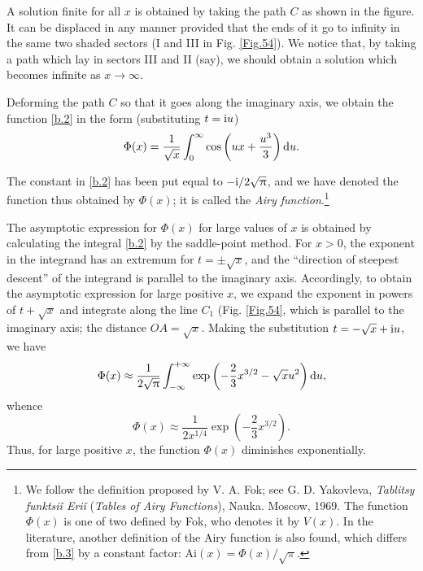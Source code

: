 A solution finite for all $ x $ is obtained by taking the path $ C $ as shown in the figure. It can be displaced in any manner provided that the ends of it go to infinity in the same two shaded sectors (I and III in Fig. \ref{Fig.54}). We notice that, by taking a path which lay in sectors III and II (say), we should obtain a solution which becomes infinite as $ x \to\infty $.

Deforming the path $ C $ so that it goes along the imaginary axis, we obtain the function \eqref{b.2} in the form (substituting $ t = \mathrm{i} u $)
\begin{equation}\label{b.3}
\Phi(x)=\frac{1}{\sqrt{x}}\int_{0}^{\infty}\cos\left(ux+\frac{u^3}{3} \right)\mathrm{d} u.
\end{equation}



The constant in \eqref{b.2} has been put equal to $ -\mathrm{i}/2\sqrt{\uppi} $, and we have denoted the function thus obtained by $ \Phi(x) $; it is called the \textit{Airy function}.\footnote{We follow the definition proposed by V. A. Fok; see G. D. Yakovleva, \textit{Tablitsy funktsi\v{i} Eri\v{i}} (\textit{Tables of Airy Functions}), Nauka. Moscow, 1969. The function $ \Phi(x) $ is one of two defined by Fok, who denotes it by $ V (x) $. In the literature, another definition of the Airy function is also found, which differs from \eqref{b.3} by a constant factor: $ \mathrm{Ai}(x) = \Phi(x)/\sqrt{\pi} $.}

The asymptotic expression for $ \Phi(x) $ for large values of $ x $ is obtained by calculating the integral \eqref{b.2} by the saddle-point method. For $ x > 0 $, the exponent in the integrand has an extremum for $ t = \pm\sqrt{x}  $, and the “direction of steepest descent” of the integrand is parallel to the imaginary axis. Accordingly, to obtain the asymptotic expression for large positive $ x $, we expand the exponent in powers of $ t + \sqrt{x} $ and integrate along the line $ C_1 $ (Fig. \ref{Fig.54}, which is parallel to the imaginary axis; the distance $ OA = \sqrt{x} $. Making the substitution $ t = -\sqrt{x} + \mathrm{i} u $, we have
\[ \Phi(x)\approx\frac{1}{2\sqrt{\uppi}}\int_{-\infty}^{+\infty}\exp\left(-\frac{2}{3}x^{3/2}-\sqrt{x}u^2 \right)\mathrm{d} u, \]
whence
\begin{equation}\label{b.4}
\Phi(x)\approx\frac{1}{2x^{1/4}}\exp\left(-\frac{2}{3}x^{3/2} \right).
\end{equation}
Thus, for large positive $ x $, the function $ \Phi(x) $ diminishes exponentially.

